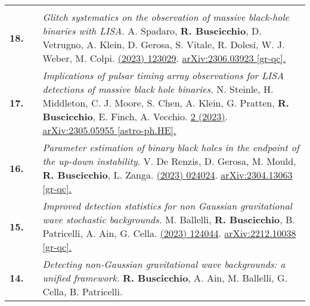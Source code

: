 {\begin{longtable}{rp{0.3cm}p{15.8cm}}
\vspace{0.09cm}\\
%
\textbf{18.} & & \textit{Glitch systematics on the observation of massive black-hole binaries with LISA.}
\newline{}
A. Spadaro, \textbf{R. Buscicchio}, D. Vetrugno, A. Klein, D. Gerosa, S. Vitale, R. Dolesi, W. J. Weber, M. Colpi.
\newline{}
\href{https://journals.aps.org/prd/abstract/10.1103/PhysRevD.108.123029}{\prd 108 (2023) 123029}. \href{https://arxiv.org/abs/2306.03923}{arXiv:2306.03923 [gr-qc].}
\vspace{0.09cm}\\
%
\textbf{17.} & & \textit{Implications of pulsar timing array observations for LISA detections of massive black hole binaries.}
\newline{}
N. Steinle, H. Middleton, C. J. Moore, S. Chen, A. Klein, G. Pratten, \textbf{R. Buscicchio}, E. Finch, A. Vecchio.
\newline{}
\href{https://academic.oup.com/mnras/article/525/2/2851/7244712}{\mnras 525 2 (2023)}. \href{https://arxiv.org/abs/2305.05955}{arXiv:2305.05955 [astro-ph.HE].}
\vspace{0.09cm}\\
%
\textbf{16.} & & \textit{Parameter estimation of binary black holes in the endpoint of the up-down instability.}
\newline{}
V. De Renzis, D. Gerosa, M. Mould, \textbf{R. Buscicchio}, L. Zanga.
\newline{}
\href{https://journals.aps.org/prd/abstract/10.1103/PhysRevD.108.024024}{\prd 108 (2023) 024024}. \href{https://arxiv.org/abs/2304.13063}{arXiv:2304.13063 [gr-qc].}
\vspace{0.09cm}\\
%
\textbf{15.} & & \textit{Improved detection statistics for non Gaussian gravitational wave stochastic backgrounds.}
\newline{}
M. Ballelli, \textbf{R. Buscicchio}, B. Patricelli, A. Ain, G. Cella.
\newline{}
\href{https://journals.aps.org/prd/abstract/10.1103/PhysRevD.107.124044}{\prd 107 (2023) 124044}. \href{https://arxiv.org/abs/2212.10038}{arXiv:2212.10038 [gr-qc].}
\vspace{0.09cm}\\
%
\textbf{14.} & & \textit{Detecting non-Gaussian gravitational wave backgrounds: a unified framework.}
\newline{}
\textbf{R. Buscicchio}, A. Ain, M. Ballelli, G. Cella, B. Patricelli.

\end{longtable}}
